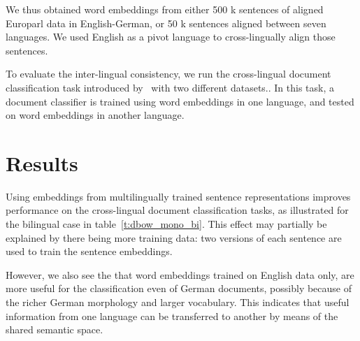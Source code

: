 \documentclass[a4paper,11pt]{article}
\begin{document}
We thus obtained word embeddings from either 500 k sentences of aligned Europarl data in English-German, or 50 k sentences aligned between seven languages. We used English as a pivot language to cross-lingually align those sentences.


To evaluate the inter-lingual consistency, we run the cross-lingual document classification task introduced by~\cite{klementiev2012inducing} with two different datasets.. In this task, a document classifier is trained using word embeddings in one language, and tested on word embeddings in another language. 


\section*{Results}
Using embeddings from multilingually trained sentence representations improves performance on the cross-lingual document classification tasks, as illustrated for the bilingual case in table~\ref{t:dbow_mono_bi}. This effect may partially be explained by there being more training data: two versions of each sentence are used to train the sentence embeddings. 

However, we also see the that word embeddings trained on English data only, are more useful for the classification even of German documents, possibly because of the richer German morphology and larger vocabulary. This indicates that useful information from one language can be transferred to another by means of the shared semantic space.
\end{document}
